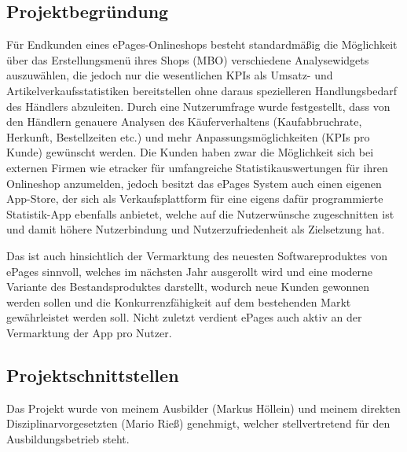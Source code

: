 \subsection{Projektbegründung} 
\label{sec:Projektbegruendung}

Für Endkunden eines ePages-Onlineshops besteht standardmäßig die Möglichkeit über das Erstellungsmenü ihres Shops (\acs{MBO}) verschiedene Analysewidgets auszuwählen, die jedoch nur die wesentlichen \acs{KPI}s als Umsatz- und Artikelverkaufsstatistiken bereitstellen ohne daraus spezielleren Handlungsbedarf des Händlers abzuleiten. Durch eine Nutzerumfrage wurde festgestellt, dass von den Händlern genauere Analysen des Käuferverhaltens (Kaufabbruchrate, Herkunft, Bestellzeiten etc.) und mehr Anpassungsmöglichkeiten (\acs{KPI}s pro Kunde) gewünscht werden. Die Kunden haben zwar die Möglichkeit sich bei externen Firmen wie etracker für umfangreiche Statistikauswertungen für ihren Onlineshop anzumelden, jedoch besitzt das ePages System auch einen eigenen App-Store, der sich als Verkaufsplattform für eine eigens dafür programmierte Statistik-App ebenfalls anbietet, welche auf die Nutzerwünsche zugeschnitten ist und damit höhere Nutzerbindung und Nutzerzufriedenheit als Zielsetzung hat.

Das ist auch hinsichtlich der Vermarktung des neuesten Softwareproduktes von ePages sinnvoll, welches im nächsten Jahr ausgerollt wird und eine moderne Variante des Bestandsproduktes darstellt, wodurch neue Kunden gewonnen werden sollen und die Konkurrenzfähigkeit auf dem bestehenden Markt gewährleistet werden soll. Nicht zuletzt verdient ePages auch aktiv an der Vermarktung der App pro Nutzer.


\subsection{Projektschnittstellen} 
\label{sec:Projektschnittstellen}

Das Projekt wurde von meinem Ausbilder (Markus Höllein) und meinem direkten Disziplinarvorgesetzten (Mario Rieß) genehmigt, welcher stellvertretend für den Ausbildungsbetrieb steht.


